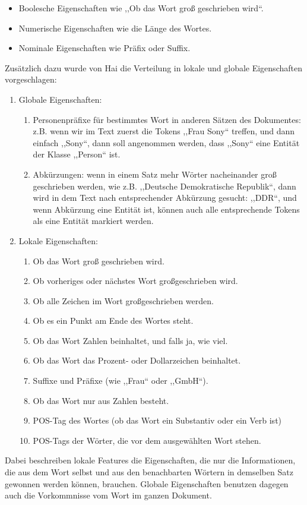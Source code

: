 \begin{itemize}
\item Boolesche Eigenschaften wie ,,Ob das Wort groß geschrieben wird``.
\item Numerische Eigenschaften wie die Länge des Wortes.
\item Nominale Eigenschaften wie Präfix oder Suffix.
\end{itemize}
Zusätzlich dazu wurde von Hai\cite{chieu2002named} die Verteilung in lokale und globale Eigenschaften vorgeschlagen:

\begin{enumerate}
\item Globale Eigenschaften:
\begin{enumerate}
\item Personenpräfixe für bestimmtes Wort in anderen Sätzen des Dokumentes: z.B. wenn wir im Text zuerst die Tokens ,,Frau Sony`` treffen, und dann einfach ,,Sony``, dann soll angenommen werden, dass ,,Sony`` eine Entität der Klasse ,,Person`` ist.
\item Abkürzungen: wenn in einem Satz mehr Wörter nacheinander groß geschrieben werden, wie z.B. ,,Deutsche Demokratische Republik``, dann wird in dem Text nach entsprechender Abkürzung gesucht: ,,DDR``, und wenn Abkürzung eine Entität ist, können auch alle entsprechende Tokens als eine Entität markiert werden.
\end{enumerate}
\item Lokale Eigenschaften:
\begin{enumerate}
\item Ob das Wort groß geschrieben wird.
\item Ob vorheriges oder nächstes Wort großgeschrieben wird.
\item Ob alle Zeichen im Wort großgeschrieben werden.
\item Ob es ein Punkt am Ende des Wortes steht.
\item Ob das Wort Zahlen beinhaltet, und falls ja, wie viel.
\item Ob das Wort das Prozent- oder Dollarzeichen beinhaltet.
\item Suffixe und Präfixe (wie ,,Frau`` oder ,,GmbH``).
\item Ob das Wort nur aus Zahlen besteht.
\item POS-Tag des Wortes (ob das Wort ein Substantiv oder ein Verb ist)
\item POS-Tags der Wörter, die vor dem ausgewählten Wort stehen.
\end{enumerate}
\end{enumerate}
Dabei beschreiben lokale Features die Eigenschaften, die nur die Informationen, die aus dem Wort selbst und aus den benachbarten Wörtern in demselben Satz gewonnen werden können, brauchen. Globale Eigenschaften benutzen dagegen auch die Vorkommnisse vom Wort im ganzen Dokument.

